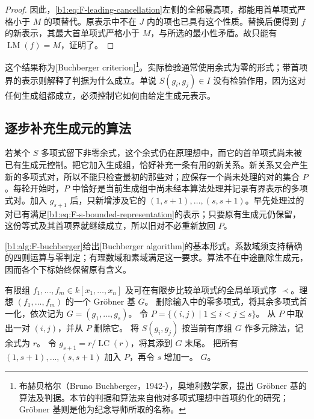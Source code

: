 \begin{proof}
	因此，\eqref{b1:eq:F-leading-cancellation}左侧的全部最高项，都能用首单项式严格小于 \(M\) 的项替代。原表示中不在 \(J\) 内的项也已具有这个性质。替换后便得到 \(f\) 的新表示，其最大首单项式严格小于 \(M\)，与所选的最小性矛盾。故只能有 \(\operatorname{LM}(f)=M\)，证明了。
\end{proof}

这个结果称为[Buchberger criterion]\footnote{布赫贝格尔（Bruno Buchberger，1942-），奥地利数学家，提出 Gröbner 基的算法及判据。本节的判据和算法来自他对多项式理想中首项约化的研究；Gröbner 基则是他为纪念导师所取的名称。}。实际检验通常使用余式为零的形式；带首项界的表示则解释了判据为什么成立。单说 \(S(g_i,g_j)\in I\) 没有检验作用，因为这对任何生成组都成立，必须控制它如何由给定生成元表示。

\subsection{逐步补充生成元的算法}
\label{b1:subsec:F03:02}

若某个 \(S\) 多项式留下非零余式，这个余式仍在原理想中，而它的首单项式尚未被已有生成元控制。把它加入生成组，恰好补充一条有用的新关系。新关系又会产生新的多项式对，所以不能只检查最初的那些对；应保存一个尚未处理的对的集合 \(P\)。每轮开始时，\(P\) 中恰好是当前生成组中尚未经本算法处理并记录有界表示的多项式对。加入 \(g_{s+1}\) 后，只新增涉及它的 \((1,s+1),\ldots,(s,s+1)\)。早先处理过的对已有满足\eqref{b1:eq:F-s-bounded-representation}的表示；只要原有生成元仍保留，这份等式及其首项界就继续成立，所以旧对不必重新放回 \(P\)。

\ProseParagraphBreak
\cref{b1:alg:F-buchberger}给出[Buchberger algorithm]的基本形式。系数域须支持精确的四则运算与零判定；有理数域和素域满足这一要求。算法不在中途删除生成元，因而各个下标始终保留原有含义。

\begin{algorithm}[htbp]
	\caption{Buchberger 算法：从有限生成元计算 Gröbner 基}
	\label{b1:alg:F-buchberger}
	\begin{algorithmsteps}{有限组 \(f_1,\ldots,f_m\in k[x_1,\ldots,x_n]\) 及可在有限步比较单项式的全局单项式序 \(\prec\)。}{理想 \((f_1,\ldots,f_m)\) 的一个 Gröbner 基 \(G\)。}
		\State 删除输入中的零多项式，将其余多项式首一化，依次记为 \(G=(g_1,\ldots,g_s)\)。
		\State 令 \(P=\bigl\{(i,j)\mid 1\le i<j\le s\bigr\}\)。
			\State 从 \(P\) 中取出一对 \((i,j)\)，并从 \(P\) 删除它。
			\State 将 \(S(g_i,g_j)\) 按当前有序组 \(G\) 作多元除法，记余式为 \(r\)。
				\State 令 \(g_{s+1}=r/\operatorname{LC}(r)\)，将其添到 \(G\) 末尾。
				\State 把所有 \((1,s+1),\ldots,(s,s+1)\) 加入 \(P\)，再令 \(s\) 增加一。
			\EndIf
		\EndWhile
		\State \Return \(G\)。
	\end{algorithmsteps}
\end{algorithm}

